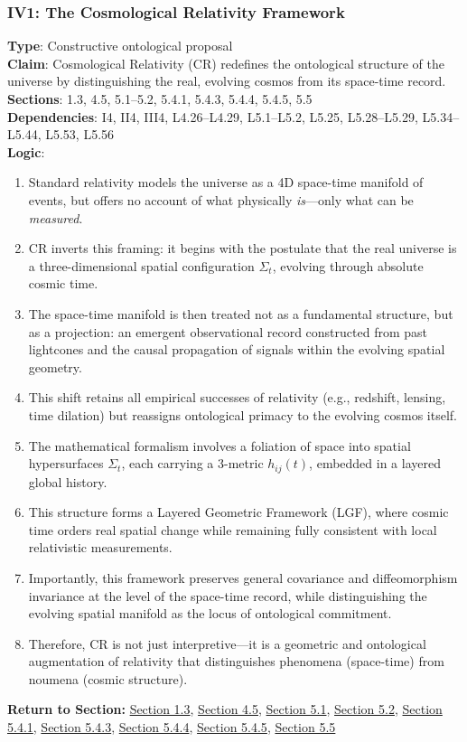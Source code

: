\documentclass[12pt]{book}
\begin{document}
\subsubsection*{IV1: The Cosmological Relativity Framework}
\label{appendix:IV1}
\textbf{Type}: Constructive ontological proposal\\
\textbf{Claim}: Cosmological Relativity (CR) redefines the ontological structure of the universe by distinguishing the real, evolving cosmos from its space-time record.\\
\textbf{Sections}: 1.3, 4.5, 5.1–5.2, 5.4.1, 5.4.3, 5.4.4, 5.4.5, 5.5\\
\textbf{Dependencies}: I4, II4, III4, L4.26–L4.29, L5.1–L5.2, L5.25, L5.28–L5.29, L5.34–L5.44, L5.53, L5.56\\
\textbf{Logic}:
\begin{enumerate}
    \item Standard relativity models the universe as a 4D space-time manifold of events, but offers no account of what physically \textit{is}---only what can be \textit{measured}.
    \item CR inverts this framing: it begins with the postulate that the real universe is a three-dimensional spatial configuration \(\Sigma_t\), evolving through absolute cosmic time.
    \item The space-time manifold is then treated not as a fundamental structure, but as a projection: an emergent observational record constructed from past lightcones and the causal propagation of signals within the evolving spatial geometry.
    \item This shift retains all empirical successes of relativity (e.g., redshift, lensing, time dilation) but reassigns ontological primacy to the evolving cosmos itself.
    \item The mathematical formalism involves a foliation of space into spatial hypersurfaces \(\Sigma_t\), each carrying a 3-metric \(h_{ij}(t)\), embedded in a layered global history.
    \item This structure forms a Layered Geometric Framework (LGF), where cosmic time orders real spatial change while remaining fully consistent with local relativistic measurements.
    \item Importantly, this framework preserves general covariance and diffeomorphism invariance at the level of the space-time record, while distinguishing the evolving spatial manifold as the locus of ontological commitment.
    \item Therefore, CR is not just interpretive---it is a geometric and ontological augmentation of relativity that distinguishes phenomena (space-time) from noumena (cosmic structure).
\end{enumerate}
\textbf{Return to Section:} \hyperref[sec:1.3]{Section 1.3}, \hyperref[sec:4.5]{Section 4.5}, \hyperref[sec:5.1]{Section 5.1}, \hyperref[sec:5.2]{Section 5.2}, \hyperref[sec:5.4.1]{Section 5.4.1}, \hyperref[sec:5.4.3]{Section 5.4.3}, \hyperref[sec:5.4.4]{Section 5.4.4}, \hyperref[sec:5.4.5]{Section 5.4.5}, \hyperref[sec:5.5]{Section 5.5}
\end{document}
